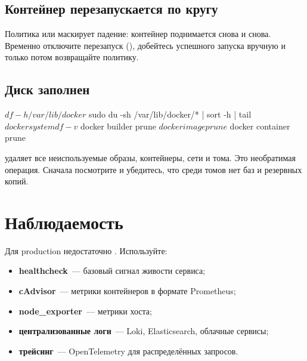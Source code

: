 \subsection{Контейнер перезапускается по кругу}


Политика  или  маскирует падение:
контейнер поднимается снова и снова. Временно отключите перезапуск
(), добейтесь успешного запуска
вручную и только потом возвращайте политику.

\subsection{Диск заполнен}

\begin{code}[language=bash]
$ df -h /var/lib/docker
$ sudo du -sh /var/lib/docker/* | sort -h | tail
$ docker system df -v
$ docker builder prune
$ docker image prune
$ docker container prune
\end{code}

\begin{warnbox}
 удаляет все неиспользуемые
образы, контейнеры, сети и тома. Это необратимая операция. Сначала
посмотрите  и убедитесь, что среди томов
нет баз и резервных копий.
\end{warnbox}

\section{Наблюдаемость}

Для production недостаточно . Используйте:

\begin{itemize}
  \item \textbf{healthcheck}~--- базовый сигнал живости сервиса;
  \item \textbf{cAdvisor}~--- метрики контейнеров в формате Prometheus;
  \item \textbf{node\_exporter}~--- метрики хоста;
  \item \textbf{централизованные логи}~--- Loki, Elasticsearch,
        облачные сервисы;
  \item \textbf{трейсинг}~--- OpenTelemetry для распределённых
        запросов.
\end{itemize}

